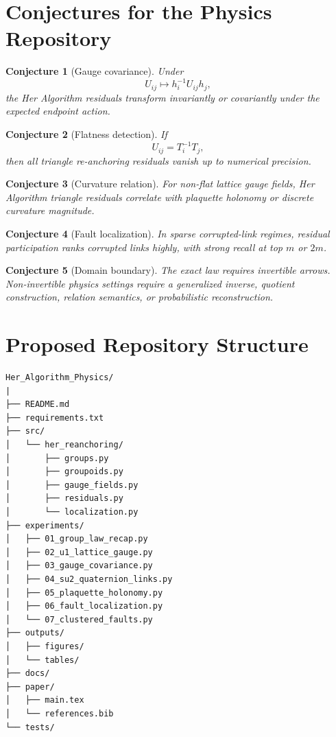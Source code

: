 \documentclass[11pt]{article}
\newtheorem{conjecture}{Conjecture}
\newcommand{\HA}{Her Algorithm}
\begin{document}
\section{Conjectures for the Physics Repository}

\begin{conjecture}[Gauge covariance]
Under
\[
U_{ij}\mapsto h_i^{-1}U_{ij}h_j,
\]
the \HA{} residuals transform invariantly or covariantly under the expected endpoint action.
\end{conjecture}

\begin{conjecture}[Flatness detection]
If
\[
U_{ij}=T_i^{-1}T_j,
\]
then all triangle re-anchoring residuals vanish up to numerical precision.
\end{conjecture}

\begin{conjecture}[Curvature relation]
For non-flat lattice gauge fields, \HA{} triangle residuals correlate with plaquette holonomy or discrete curvature magnitude.
\end{conjecture}

\begin{conjecture}[Fault localization]
In sparse corrupted-link regimes, residual participation ranks corrupted links highly, with strong recall at top \(m\) or \(2m\).
\end{conjecture}

\begin{conjecture}[Domain boundary]
The exact law requires invertible arrows. Non-invertible physics settings require a generalized inverse, quotient construction, relation semantics, or probabilistic reconstruction.
\end{conjecture}

\section{Proposed Repository Structure}

\begin{verbatim}
Her_Algorithm_Physics/
|
├── README.md
├── requirements.txt
├── src/
│   └── her_reanchoring/
│       ├── groups.py
│       ├── groupoids.py
│       ├── gauge_fields.py
│       ├── residuals.py
│       └── localization.py
├── experiments/
│   ├── 01_group_law_recap.py
│   ├── 02_u1_lattice_gauge.py
│   ├── 03_gauge_covariance.py
│   ├── 04_su2_quaternion_links.py
│   ├── 05_plaquette_holonomy.py
│   ├── 06_fault_localization.py
│   └── 07_clustered_faults.py
├── outputs/
│   ├── figures/
│   └── tables/
├── docs/
├── paper/
│   ├── main.tex
│   └── references.bib
└── tests/
\end{verbatim}
\end{document}
